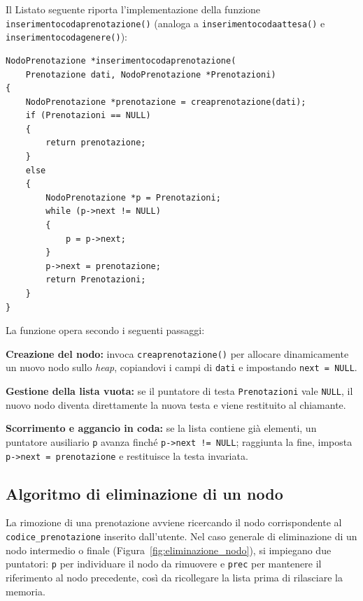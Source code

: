 \documentclass[11pt,a4paper,oneside,openany]{book}
\newenvironment{listacomp}{%
    \small
    \begin{list}{\textendash}{%
        \setlength{\topsep}{2pt}%
        \setlength{\partopsep}{0pt}%
        \setlength{\itemsep}{1pt}%
        \setlength{\parsep}{0pt}%
        \setlength{\leftmargin}{1.2em}%
    }%
}{%
    \end{list}%
}
\begin{document}
\begin{samepage}
Il Listato seguente riporta l'implementazione della funzione \texttt{inserimentocodaprenotazione()} (analoga a \texttt{inserimentocodaattesa()} e \texttt{inserimentocodagenere()}):

\begin{lstlisting}[caption={Inserimento in coda nella lista delle prenotazioni}]
NodoPrenotazione *inserimentocodaprenotazione(
    Prenotazione dati, NodoPrenotazione *Prenotazioni)
{
    NodoPrenotazione *prenotazione = creaprenotazione(dati);
    if (Prenotazioni == NULL)
    {
        return prenotazione;
    }
    else
    {
        NodoPrenotazione *p = Prenotazioni;
        while (p->next != NULL)
        {
            p = p->next;
        }
        p->next = prenotazione;
        return Prenotazioni;
    }
}
\end{lstlisting}

La funzione opera secondo i seguenti passaggi:
\begin{listacomp}
    \item \textbf{Creazione del nodo:} invoca \texttt{creaprenotazione()} per allocare dinamicamente un nuovo nodo sullo \emph{heap}, copiandovi i campi di \texttt{dati} e impostando \texttt{next = NULL}.
    \item \textbf{Gestione della lista vuota:} se il puntatore di testa \texttt{Prenotazioni} vale \texttt{NULL}, il nuovo nodo diventa direttamente la nuova testa e viene restituito al chiamante.
    \item \textbf{Scorrimento e aggancio in coda:} se la lista contiene già elementi, un puntatore ausiliario \texttt{p} avanza finché \texttt{p->next != NULL}; raggiunta la fine, imposta \texttt{p->next = prenotazione} e restituisce la testa invariata.
\end{listacomp}
\end{samepage}

\subsection{Algoritmo di eliminazione di un nodo}
La rimozione di una prenotazione avviene ricercando il nodo corrispondente al \texttt{codice\_prenotazione} inserito dall'utente. Nel caso generale di eliminazione di un nodo intermedio o finale (Figura~\ref{fig:eliminazione_nodo}), si impiegano due puntatori: \texttt{p} per individuare il nodo da rimuovere e \texttt{prec} per mantenere il riferimento al nodo precedente, così da ricollegare la lista prima di rilasciare la memoria.
\end{document}
